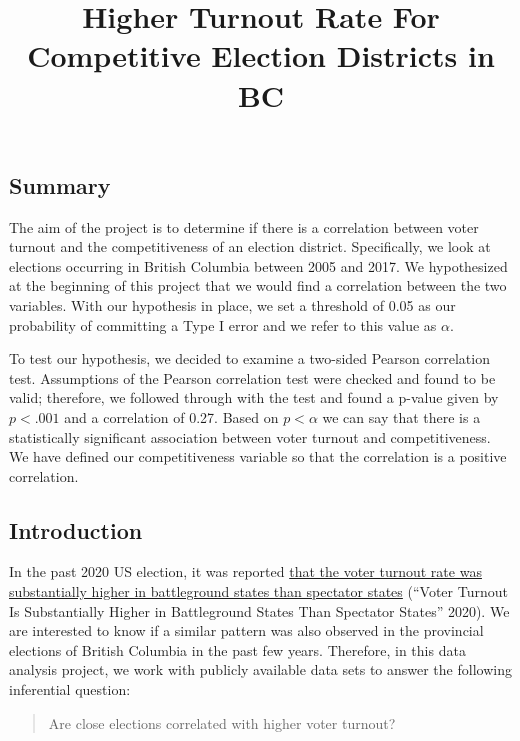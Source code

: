 \documentclass[
]{article}
\title{Higher Turnout Rate For Competitive Election Districts in BC}
\author{}
\date{\vspace{-2.5em}}
\begin{document}
\maketitle

{
\setcounter{tocdepth}{2}
\tableofcontents
}
\hypertarget{summary}{%
\subsection{Summary}\label{summary}}

The aim of the project is to determine if there is a correlation between
voter turnout and the competitiveness of an election district.
Specifically, we look at elections occurring in British Columbia between
2005 and 2017. We hypothesized at the beginning of this project that we
would find a correlation between the two variables. With our hypothesis
in place, we set a threshold of 0.05 as our probability of committing a
Type I error and we refer to this value as \(\alpha\).

To test our hypothesis, we decided to examine a two-sided Pearson
correlation test. Assumptions of the Pearson correlation test were
checked and found to be valid; therefore, we followed through with the
test and found a p-value given by \(p < .001\) and a correlation of
0.27. Based on \(p < \alpha\) we can say that there is a statistically
significant association between voter turnout and competitiveness. We
have defined our competitiveness variable so that the correlation is a
positive correlation.

\hypertarget{introduction}{%
\subsection{Introduction}\label{introduction}}

In the past 2020 US election, it was reported
\href{https://www.nationalpopularvote.com/voter-turnout-substantially-higher-battleground-states-spectator-states}{that
the voter turnout rate was substantially higher in battleground states
than spectator states} ({``Voter Turnout Is Substantially Higher in
Battleground States Than Spectator States''} 2020). We are interested to
know if a similar pattern was also observed in the provincial elections
of British Columbia in the past few years. Therefore, in this data
analysis project, we work with publicly available data sets to answer
the following inferential question:

\begin{quote}
Are close elections correlated with higher voter turnout?
\end{quote}
\end{document}
